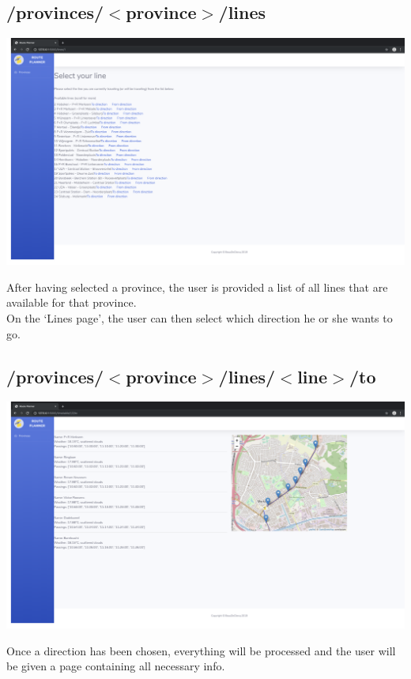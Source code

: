\documentclass[12pt]{article}
\begin{document}
\subsection{/provinces/$<$province$>$/lines}
\begin{center}
	\includegraphics[width=\linewidth]{images/Select_line.png}
\end{center}
After having selected a province, the user is provided a list of all lines that are available for that province.\\
On the \lq Lines page\rq, the user can then select which direction he or she wants to go.

\subsection{/provinces/$<$province$>$/lines/$<$line$>$/to}
\begin{center}
	\includegraphics[width=\linewidth]{images/Route_to.png}
\end{center}
Once a direction has been chosen, everything will be processed and  the user will be given a page containing all necessary info.
\end{document}
